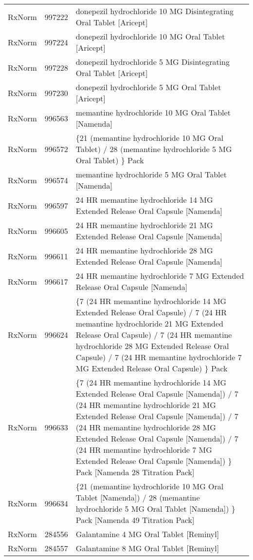 \begin{longtable}{p{}p{}p{}}
  RxNorm & 997222 & donepezil hydrochloride 10 MG Disintegrating Oral Tablet [Aricept] \\ 
  RxNorm & 997224 & donepezil hydrochloride 10 MG Oral Tablet [Aricept] \\ 
  RxNorm & 997228 & donepezil hydrochloride 5 MG Disintegrating Oral Tablet [Aricept] \\ 
  RxNorm & 997230 & donepezil hydrochloride 5 MG Oral Tablet [Aricept] \\ 
  RxNorm & 996563 & memantine hydrochloride 10 MG Oral Tablet [Namenda] \\ 
  RxNorm & 996572 & \{21 (memantine hydrochloride 10 MG Oral Tablet) / 28 (memantine hydrochloride 5 MG Oral Tablet) \} Pack \\ 
  RxNorm & 996574 & memantine hydrochloride 5 MG Oral Tablet [Namenda] \\ 
  RxNorm & 996597 & 24 HR memantine hydrochloride 14 MG Extended Release Oral Capsule [Namenda] \\ 
  RxNorm & 996605 & 24 HR memantine hydrochloride 21 MG Extended Release Oral Capsule [Namenda] \\ 
  RxNorm & 996611 & 24 HR memantine hydrochloride 28 MG Extended Release Oral Capsule [Namenda] \\ 
  RxNorm & 996617 & 24 HR memantine hydrochloride 7 MG Extended Release Oral Capsule [Namenda] \\ 
  RxNorm & 996624 & \{7 (24 HR memantine hydrochloride 14 MG Extended Release Oral Capsule) / 7 (24 HR memantine hydrochloride 21 MG Extended Release Oral Capsule) / 7 (24 HR memantine hydrochloride 28 MG Extended Release Oral Capsule) / 7 (24 HR memantine hydrochloride 7 MG Extended Release Oral Capsule) \} Pack \\ 
  RxNorm & 996633 & \{7 (24 HR memantine hydrochloride 14 MG Extended Release Oral Capsule [Namenda]) / 7 (24 HR memantine hydrochloride 21 MG Extended Release Oral Capsule [Namenda]) / 7 (24 HR memantine hydrochloride 28 MG Extended Release Oral Capsule [Namenda]) / 7 (24 HR memantine hydrochloride 7 MG Extended Release Oral Capsule [Namenda]) \} Pack [Namenda 28 Titration Pack] \\ 
  RxNorm & 996634 & \{21 (memantine hydrochloride 10 MG Oral Tablet [Namenda]) / 28 (memantine hydrochloride 5 MG Oral Tablet [Namenda]) \} Pack [Namenda 49 Titration Pack] \\ 
  RxNorm & 284556 & Galantamine 4 MG Oral Tablet [Reminyl] \\ 
  RxNorm & 284557 & Galantamine 8 MG Oral Tablet [Reminyl] \\ 

\end{longtable}
